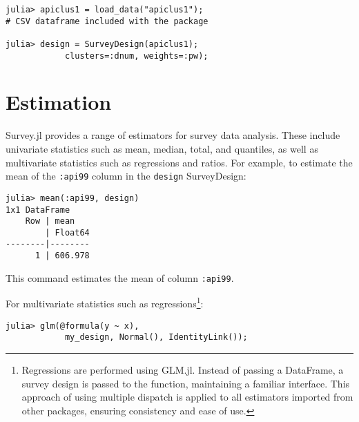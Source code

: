 \documentclass{juliacon}
\begin{document}
\begin{lstlisting}
julia> apiclus1 = load_data("apiclus1"); 
# CSV dataframe included with the package

julia> design = SurveyDesign(apiclus1); 
            clusters=:dnum, weights=:pw);
    \end{lstlisting}


\section{Estimation}

Survey.jl provides a range of estimators for survey data analysis. These include univariate statistics such as mean, median, total, and quantiles, as well as multivariate statistics such as regressions and ratios. For example, to estimate the mean of the \verb|:api99| column in the \verb|design| SurveyDesign:

\begin{lstlisting}
julia> mean(:api99, design)
1x1 DataFrame
    Row | mean    
        | Float64 
--------|--------
      1 | 606.978
    \end{lstlisting}
This command estimates the mean of column \verb|:api99|.

For multivariate statistics such as regressions\footnote{Regressions are performed using GLM.jl. Instead of passing a DataFrame, a survey design is passed to the function, maintaining a familiar interface. This approach of using multiple dispatch is applied to all estimators imported from other packages, ensuring consistency and ease of use.}:

\begin{lstlisting}
julia> glm(@formula(y ~ x),
            my_design, Normal(), IdentityLink()); 
\end{lstlisting}
\end{document}
